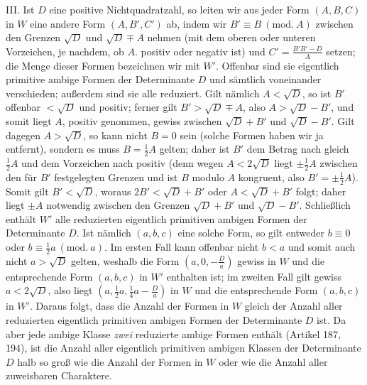 III. Ist $D$ eine positive Nichtquadratzahl, so leiten wir aus jeder Form $(A,B,C)$ in $W$ eine andere Form $(A,B',C')$ ab, indem wir $B'\equiv B\ (\mathrm{mod.}\ A)$ zwischen den Grenzen $\sqrt{D}$ und $\sqrt{D}\mp A$ nehmen (mit dem oberen oder unteren Vorzeichen, je nachdem, ob $A$. positiv oder negativ ist) und $C'=\frac{B'B'-D}{A}$ setzen; die Menge dieser Formen bezeichnen wir mit $W'$. Offenbar sind sie eigentlich primitive ambige Formen der Determinante $D$ und sämtlich voneinander verschieden; außerdem sind sie alle reduziert. Gilt nämlich $A<\sqrt{D}$, so ist $B'$ offenbar $<\sqrt{D}$ und positiv; ferner gilt $B'>\sqrt{D}\mp A$, also $A>\sqrt{D}-B'$, und somit liegt $A$, positiv genommen, gewiss zwischen $\sqrt{D}+B'$ und $\sqrt{D}-B'$. Gilt dagegen $A>\sqrt{D}$, so kann nicht $B=0$ sein (solche Formen haben wir ja entfernt), sondern es muss $B=\frac12 A$ gelten; daher ist $B'$ dem Betrag nach gleich $\frac12 A$ und dem Vorzeichen nach positiv (denn wegen $A<2\sqrt{D}$ liegt $\pm\frac12 A$ zwischen den für $B'$ festgelegten Grenzen und ist $B$ modulo $A$ kongruent, also $B'=\pm\frac12 A$). Somit gilt $B'<\sqrt{D}$, woraus $2B'<\sqrt{D}+B'$ oder $A<\sqrt{D}+B'$ folgt; daher liegt $\pm A$ notwendig zwischen den Grenzen $\sqrt{D}+B'$ und $\sqrt{D}-B'$. Schließlich enthält $W'$ alle reduzierten eigentlich primitiven ambigen Formen der Determinante $D$. Ist nämlich $(a,b,c)$ eine solche Form, so gilt entweder $b\equiv0$ oder $b\equiv\frac12 a\ (\mathrm{mod.}\ a)$. Im ersten Fall kann offenbar nicht $b<a$ und somit auch nicht $a>\sqrt{D}$ gelten, weshalb die Form $\left(a,0,-\frac{D}{a}\right)$ gewiss
in $W$ und die entsprechende Form $(a,b,c)$ in $W'$ enthalten ist; im zweiten Fall gilt gewiss $a<2\sqrt{D}$, also liegt $\left(a,\allowbreak \frac12 a,\allowbreak \frac14 a-\frac{D}{a}\right)$ in $W$ und die entsprechende Form $(a,b,c)$ in $W'$. Daraus folgt, dass die Anzahl der Formen in $W$ gleich der Anzahl aller reduzierten eigentlich primitiven ambigen Formen der Determinante $D$ ist. Da aber jede ambige Klasse \textit{zwei} reduzierte ambige Formen enthält (Artikel 187, 194), ist die Anzahl aller eigentlich primitiven ambigen Klassen der Determinante $D$ halb so groß wie die Anzahl der Formen in $W$ oder wie die Anzahl aller zuweisbaren Charaktere.

